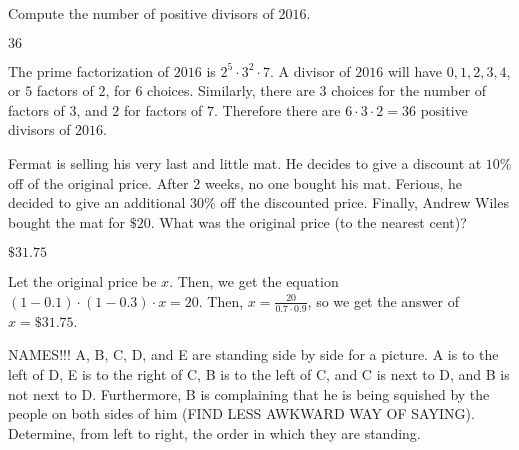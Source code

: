 \documentclass[11pt]{article}
\begin{document}
\begin{problem}
Compute the number of positive divisors of $2016$.
\end{problem}

\begin{answer}
$\boxed{36}$
\end{answer}

\begin{solution}
The prime factorization of $2016$ is $2^5 \cdot 3^2 \cdot 7$. A divisor of $2016$ will have $0, 1, 2, 3, 4$, or $5$ factors of $2$, for $6$ choices. Similarly, there are $3$ choices for the number of factors of $3$, and $2$ for factors of $7$. Therefore there are $6 \cdot 3 \cdot 2 = \boxed{36}$ positive divisors of $2016$.
\end{solution}


\begin{problem} %
Fermat is selling his very last and little mat. He decides to give a discount at $10\%$ off of the original price. After 2 weeks, no one bought his mat. Ferious, he decided to give an additional $30\%$ off the discounted price. Finally, Andrew Wiles bought the mat for $\$20$. What was the original price (to the nearest cent)?
\end{problem}

\begin{answer}
$\$31.75$
\end{answer}

\begin{solution}
Let the original price be $x$. Then, we get the equation $(1-0.1) \cdot (1-0.3) \cdot x = 20$. Then, $x = \frac{20}{0.7 \cdot 0.9}$, so we get the answer of $x = \$31.75$.
\end{solution}


\begin{problem}

NAMES!!! A, B, C, D, and E are standing side by side for a picture. A is to the left of D, E is to the right of C, B is to the left of C, and C is next to D, and B is not next to D. Furthermore, B is complaining that he is being squished by the people on both sides of him (FIND LESS AWKWARD WAY OF SAYING). Determine, from left to right, the order in which they are standing.
\end{problem}
\end{document}
